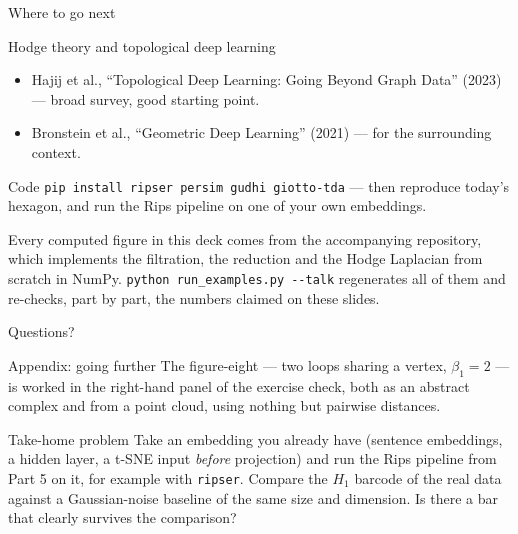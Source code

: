 \documentclass[10pt,aspectratio=169]{beamer}
\begin{document}
\begin{frame}[shrink=10]{Where to go next}
\begin{block}{Hodge theory and topological deep learning}
\begin{itemize}
                \item Hajij et al., ``Topological Deep Learning: Going Beyond Graph Data'' (2023) --- broad survey, good starting point.
                \item Bronstein et al., ``Geometric Deep Learning'' (2021) --- for the surrounding context.
            \end{itemize}
        \end{block}
        \begin{block}{Code}
            \texttt{pip install ripser persim gudhi giotto-tda} --- then reproduce today's hexagon,
            and run the Rips pipeline on one of your own embeddings.

            \vspace{0.3em}
            Every computed figure in this deck comes from the accompanying repository, which
            implements the filtration, the reduction and the Hodge Laplacian from scratch in
            NumPy. \texttt{python run\_examples.py -{}-talk} regenerates all of them and
            re-checks, part by part, the numbers claimed on these slides.
        \end{block}
    \end{frame}

    \begin{frame}[standout]
  Questions?
    \end{frame}

    \appendix

    \begin{frame}{Appendix: going further}
        \small
        The figure-eight --- two loops sharing a vertex, $\beta_1=2$ --- is worked in the
        right-hand panel of the exercise check, both as an abstract complex and from a point
        cloud, using nothing but pairwise distances.

        \vspace{0.6em}
        \begin{block}{Take-home problem}
            Take an embedding you already have (sentence embeddings, a hidden layer, a t-SNE
            input \emph{before} projection) and run the Rips pipeline from Part 5 on it, for
            example with \texttt{ripser}.
            Compare the $H_1$ barcode of the real data against a Gaussian-noise baseline of the
            same size and dimension. Is there a bar that clearly survives the comparison?
        \end{block}
    \end{frame}
\end{document}
